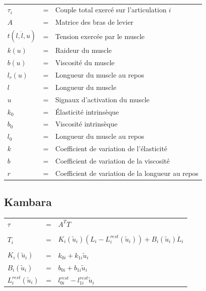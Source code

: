 \documentclass[pdftex,a4paper,11pt]{article}
\begin{document}
\paragraph{}
\begin{tabular}{lcl}
    $\tau_i$ & = & Couple total exercé sur l'articulation $i$ \\
    $A$  & = & Matrice des bras de levier \\
    $t(l, \dot{l}, u)$  & = & Tension exercée par le muscle \\
    $k(u)$ & = & Raideur du muscle \\
    $b(u)$ & = & Viscosité du muscle \\
    $l_r(u)$ & = & Longueur du muscle au repos \\
    $l$ & = & Longueur du muscle \\
    $u$ & = & Signaux d'activation du muscle \\
    $k_0$ & = & Élasticité intrinsèque \\
    $b_0$ & = & Viscosité intrinsèque \\
    $l_0$ & = & Longueur du muscle au repos \\
    $k$ & = & Coefficient de variation de l'élasticité \\
    $b$ & = & Coefficient de variation de la viscosité \\
    $r$ & = & Coefficient de variation de la longueur au repos \\
\end{tabular}


\subsection{Kambara}

\begin{tabular}{lcl}
    $\tau$ & = & $A^T T$ \\
    \\
    $T_i$                     & = & $K_i(\tilde{u}_i) (L_i - L_i^{rest}(\tilde{u}_i)) + B_i(\tilde{u}_i) \dot{L}_i$ \\
    \\
    $K_i(\tilde{u}_i)$        & = & $k_{0i} + k_{1i} \tilde{u}_i$ \\
    $B_i(\tilde{u}_i)$        & = & $b_{0i} + b_{1i} \tilde{u}_i$ \\
    $L_i^{rest}(\tilde{u}_i)$ & = & $ l_{0i}^{rest} - l_{1i}^{rest} \tilde{u}_i$ \\
\end{tabular}
\end{document}
